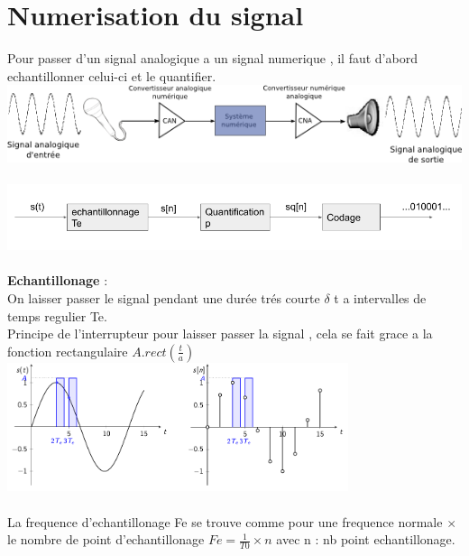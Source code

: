 \documentclass[a4paper,8pt,openany]{book}
\begin{document}
\chapter{Numerisation du signal}
Pour passer d'un signal analogique a un signal numerique , il faut d'abord echantillonner celui-ci et le quantifier.\\
\includegraphics[width=1\textwidth,center]{img/enreg-numerique.png}\\
\\
\includegraphics[width=1\textwidth,center]{img/chaine_numerisation_signal.png}\\
\\
\textbf{Echantillonage} :\\
On laisser passer le signal pendant une dur\'ee tr\'es courte $\delta$ t a intervalles de temps regulier Te.\\
Principe de l'interrupteur pour laisser passer la signal , cela se fait grace a la fonction rectangulaire $A.rect(\frac{t}{a})$\\
\includegraphics[width=0.75\textwidth,center]{img/echantillonage.png}\\
\\
La frequence d'echantillonage Fe se trouve comme pour une frequence normale $\times$ le nombre de point d'echantillonage $Fe=\frac{1}{T0}\times n$ avec n : nb point echantillonage.\\
\end{document}
